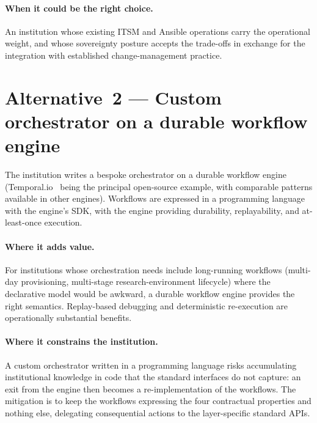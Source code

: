 \paragraph{When it could be the right choice.} An institution
whose existing ITSM and Ansible operations carry the operational
weight, and whose sovereignty posture accepts the trade-offs in
exchange for the integration with established change-management
practice.

\section{Alternative~2 --- Custom orchestrator on a durable workflow engine}
\label{sec:or-alt2}

\begin{alternativebox}
\noindent The institution writes a bespoke orchestrator on a
durable workflow engine (Temporal.io~\cite{temporal} being the
principal open-source example, with comparable patterns available
in other engines). Workflows are expressed in a programming language with
the engine's SDK, with the engine providing durability,
replayability, and at-least-once execution.
\end{alternativebox}

\paragraph{Where it adds value.} For institutions whose
orchestration needs include long-running workflows (multi-day
provisioning, multi-stage research-environment lifecycle) where the
declarative model would be awkward, a durable workflow engine
provides the right semantics. Replay-based debugging and
deterministic re-execution are operationally substantial benefits.

\paragraph{Where it constrains the institution.} A custom
orchestrator written in a programming language risks accumulating
institutional knowledge in code that the standard interfaces do not
capture: an exit from the engine then becomes a re-implementation
of the workflows. The mitigation is to keep the workflows
expressing the four contractual properties and nothing else,
delegating consequential actions to the layer-specific standard
APIs.

